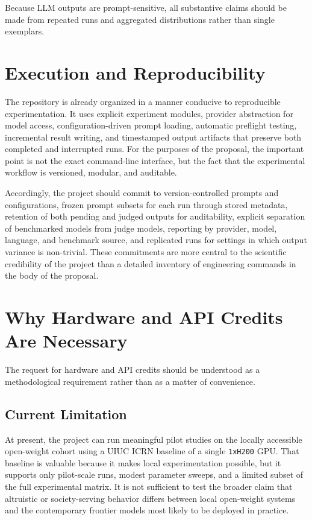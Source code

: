 \documentclass{article}
\begin{document}
Because LLM outputs are prompt-sensitive, all substantive claims should be made from repeated runs and aggregated distributions rather than single exemplars.

\section{Execution and Reproducibility}
The repository is already organized in a manner conducive to reproducible experimentation. It uses explicit experiment modules, provider abstraction for model access, configuration-driven prompt loading, automatic preflight testing, incremental result writing, and timestamped output artifacts that preserve both completed and interrupted runs. For the purposes of the proposal, the important point is not the exact command-line interface, but the fact that the experimental workflow is versioned, modular, and auditable.

Accordingly, the project should commit to version-controlled prompts and configurations, frozen prompt subsets for each run through stored metadata, retention of both pending and judged outputs for auditability, explicit separation of benchmarked models from judge models, reporting by provider, model, language, and benchmark source, and replicated runs for settings in which output variance is non-trivial. These commitments are more central to the scientific credibility of the project than a detailed inventory of engineering commands in the body of the proposal.

\section{Why Hardware and API Credits Are Necessary}
The request for hardware and API credits should be understood as a methodological requirement rather than as a matter of convenience.

\subsection{Current Limitation}
At present, the project can run meaningful pilot studies on the locally accessible open-weight cohort using a UIUC ICRN baseline of a single \texttt{1xH200} GPU. That baseline is valuable because it makes local experimentation possible, but it supports only pilot-scale runs, modest parameter sweeps, and a limited subset of the full experimental matrix. It is not sufficient to test the broader claim that altruistic or society-serving behavior differs between local open-weight systems and the contemporary frontier models most likely to be deployed in practice.
\end{document}
